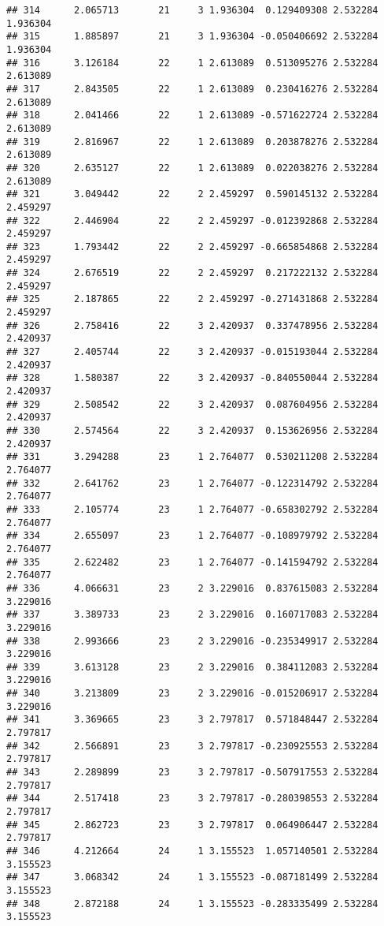 \documentclass[]{book}
\theoremstyle{definition}
\theoremstyle{definition}
\theoremstyle{definition}
\theoremstyle{remark}
\begin{document}
\begin{verbatim}
## 314      2.065713       21     3 1.936304  0.129409308 2.532284 1.936304
## 315      1.885897       21     3 1.936304 -0.050406692 2.532284 1.936304
## 316      3.126184       22     1 2.613089  0.513095276 2.532284 2.613089
## 317      2.843505       22     1 2.613089  0.230416276 2.532284 2.613089
## 318      2.041466       22     1 2.613089 -0.571622724 2.532284 2.613089
## 319      2.816967       22     1 2.613089  0.203878276 2.532284 2.613089
## 320      2.635127       22     1 2.613089  0.022038276 2.532284 2.613089
## 321      3.049442       22     2 2.459297  0.590145132 2.532284 2.459297
## 322      2.446904       22     2 2.459297 -0.012392868 2.532284 2.459297
## 323      1.793442       22     2 2.459297 -0.665854868 2.532284 2.459297
## 324      2.676519       22     2 2.459297  0.217222132 2.532284 2.459297
## 325      2.187865       22     2 2.459297 -0.271431868 2.532284 2.459297
## 326      2.758416       22     3 2.420937  0.337478956 2.532284 2.420937
## 327      2.405744       22     3 2.420937 -0.015193044 2.532284 2.420937
## 328      1.580387       22     3 2.420937 -0.840550044 2.532284 2.420937
## 329      2.508542       22     3 2.420937  0.087604956 2.532284 2.420937
## 330      2.574564       22     3 2.420937  0.153626956 2.532284 2.420937
## 331      3.294288       23     1 2.764077  0.530211208 2.532284 2.764077
## 332      2.641762       23     1 2.764077 -0.122314792 2.532284 2.764077
## 333      2.105774       23     1 2.764077 -0.658302792 2.532284 2.764077
## 334      2.655097       23     1 2.764077 -0.108979792 2.532284 2.764077
## 335      2.622482       23     1 2.764077 -0.141594792 2.532284 2.764077
## 336      4.066631       23     2 3.229016  0.837615083 2.532284 3.229016
## 337      3.389733       23     2 3.229016  0.160717083 2.532284 3.229016
## 338      2.993666       23     2 3.229016 -0.235349917 2.532284 3.229016
## 339      3.613128       23     2 3.229016  0.384112083 2.532284 3.229016
## 340      3.213809       23     2 3.229016 -0.015206917 2.532284 3.229016
## 341      3.369665       23     3 2.797817  0.571848447 2.532284 2.797817
## 342      2.566891       23     3 2.797817 -0.230925553 2.532284 2.797817
## 343      2.289899       23     3 2.797817 -0.507917553 2.532284 2.797817
## 344      2.517418       23     3 2.797817 -0.280398553 2.532284 2.797817
## 345      2.862723       23     3 2.797817  0.064906447 2.532284 2.797817
## 346      4.212664       24     1 3.155523  1.057140501 2.532284 3.155523
## 347      3.068342       24     1 3.155523 -0.087181499 2.532284 3.155523
## 348      2.872188       24     1 3.155523 -0.283335499 2.532284 3.155523

\end{verbatim}
\end{document}
